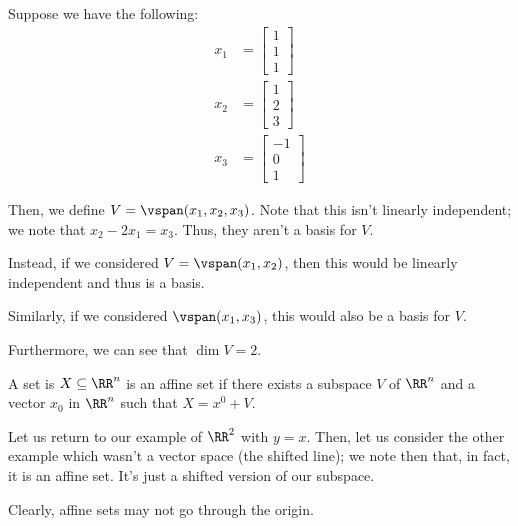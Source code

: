 \documentclass[openany]{book}
\begin{document}
\begin{example}
	Suppose we have the following:
	\begin{align*}
		x_1 &= \begin{bmatrix}
			1 \\ 1 \\ 1
		\end{bmatrix} \\
	x_2 &= \begin{bmatrix}
		1 \\ 2 \\ 3
	\end{bmatrix} \\
	x_3 &= \begin{bmatrix}
		-1 \\ 0 \\ 1
	\end{bmatrix}
	\end{align*} 

	Then, we define $V = \vspan(x_1, x_2, x_3)$. Note that this isn't linearly independent;  we note that $x_2 - 2x_1 = x_3$. Thus, they aren't a basis for $V$.
	
	Instead, if we considered $V = \vspan(x_1, x_2)$, then this would be linearly independent and thus is a basis.
	
	Similarly, if we considered $\vspan(x_1, x_3)$, this would also be a basis for $V$.
	
	Furthermore, we can see that $\dim V = 2$.
\end{example}

\begin{defn}
	A set is $X \subseteq \RR^{n}$ is an affine set if there exists a subspace $V$ of $\RR^{n}$ and a vector $x_0$ in $\RR^{n}$ such that $X = x^{0} + V$.
\end{defn}

\begin{example}
	Let us return to our example of $\RR^{2}$ with $y = x$. Then, let us consider the other example which wasn't a vector space (the shifted line); we note then that, in fact, it is an affine set. It's just a shifted version of our subspace.
\end{example}
\begin{warn}
	Clearly, affine sets may not go through the origin.
\end{warn}
\end{document}
